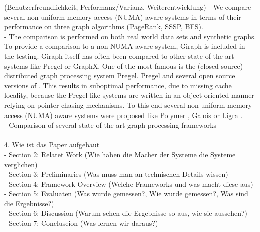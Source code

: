(Benutzerfreundlichkeit, Performanz/Varianz, Weiterentwicklung)
- We compare several non-uniform memory access (NUMA) aware systems in terms of their performance on three graph algorithms (PageRank, SSSP, BFS).\\
- The comparison is performed on both real world data sets and synthetic graphs.
To provide a comparison to a non-NUMA aware system, Giraph\cite{Giraph} is included in the testing. Giraph itself has often been compared to other state of the art systems like Pregel or GraphX.
One of the most famous is the (closed source) distributed graph processing system Pregel. Pregel and several open source versions of .
This results in suboptimal performance, due to missing cache locality, because the Pregel like systems are written in an object oriented manner relying on pointer chasing mechanisms. To this end several non-uniform memory access (NUMA) aware systems were proposed like Polymer \cite{Polymer}, Galois \cite{Galois} or Ligra \cite{Ligra}.\\
- Comparison of several state-of-the-art graph processing frameworks\\
\\
4. Wie ist das Paper aufgebaut\\
- Section 2: Relatet Work (Wie haben die Macher der Systeme die Systeme verglichen)\\
- Section 3: Preliminaries (Was muss man an technischen Details wissen)\\
- Section 4: Framework Overview (Welche Frameworks und was macht diese aus)\\
- Section 5: Evaluaten (Was wurde gemessen?, Wie wurde gemessen?, Was sind die Ergebnisse?)\\
- Section 6: Discussion (Warum sehen die Ergebnisse so aus, wie sie aussehen?)\\
- Section 7: Concluseion (Was lernen wir daraus?)\\
